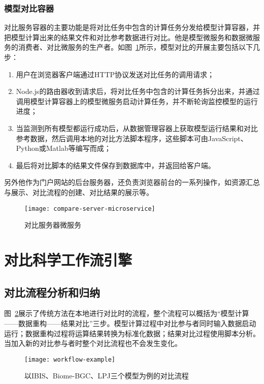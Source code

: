\subsubsection{模型对比容器}
对比服务容器的主要功能是将对比任务中包含的计算任务分发给模型计算容器，并把模型计算出来的结果文件和对比参考数据进行对比。他是模型微服务和数据微服务的消费者、对比微服务的生产者。如图~\ref{fig:compare-server-microservice}所示，模型对比的开展主要包括以下几步：

\begin{enumerate}[(1)]
\item 用户在浏览器客户端通过HTTP协议发送对比任务的调用请求；
\item Node.js的路由器收到请求后，将对比任务中包含的计算任务拆分出来，并通过调用模型计算容器上的模型微服务启动计算任务，并不断轮询监控模型的运行进度；
\item 当监测到所有模型都运行成功后，从数据管理容器上获取模型运行结果和对比参考数据，然后调用本地的对比方法脚本程序，这些脚本可由JavaScript、Python或Matlab等编写而成；
\item 最后将对比脚本的结果文件保存到数据库中，并返回给客户端。
\end{enumerate}

另外他作为门户网站的后台服务器，还负责浏览器前台的一系列操作，如资源汇总与展示、对比流程的创建、对比结果的展示等。

\begin{figure}[!htbp]
    \centering
    \texttt{[image: compare-server-microservice]}
    \caption{对比服务器微服务}
    \label{fig:compare-server-microservice}
\end{figure}

\section{对比科学工作流引擎}
\subsection{对比流程分析和归纳}
图~\ref{fig:workflow-example}展示了传统方法在本地进行对比时的流程，整个流程可以概括为“模型计算——数据重构——结果对比”三步。模型计算过程中对比参与者同时输入数据启动运行；数据重构过程将运算结果转换为标准化数据；结果对比过程使用脚本分析。当加入新的对比参与者时整个对比流程也不会发生变化。

\begin{figure}[!htbp]
    \centering
    \texttt{[image: workflow-example]}
    \caption{以IBIS、Biome-BGC、LPJ三个模型为例的对比流程}
    \label{fig:workflow-example}
\end{figure}

